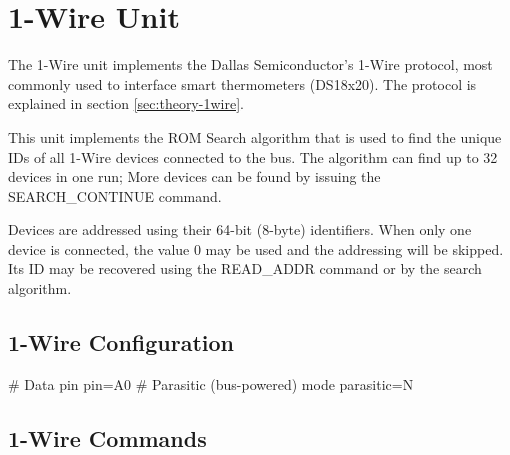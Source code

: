 \section{1-Wire Unit}

The 1-Wire unit implements the Dallas Semiconductor's 1-Wire protocol, most commonly used to interface smart thermometers (DS18x20). The protocol is explained in section \ref{sec:theory-1wire}.

This unit implements the ROM Search algorithm that is used to find the unique IDs of all 1-Wire devices connected to the bus. The algorithm can find up to 32 devices in one run; More devices can be found by issuing the SEARCH\_CONTINUE command.

Devices are addressed using their 64-bit (8-byte) identifiers. When only one device is connected, the value 0 may be used and the addressing will be skipped. Its ID may be recovered using the READ\_ADDR command or by the search algorithm.

\subsection{1-Wire Configuration}

\begin{inicode}
[1WIRE:ow@7]
# Data pin
pin=A0
# Parasitic (bus-powered) mode
parasitic=N
\end{inicode}

\subsection{1-Wire Commands}

